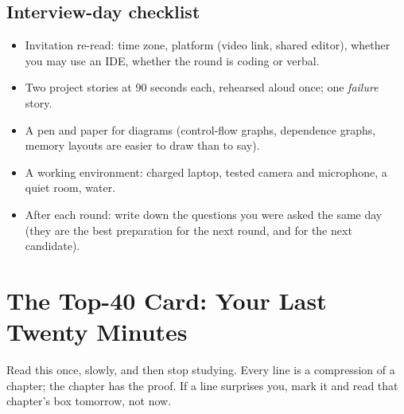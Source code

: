 \documentclass[10pt,a4paper,openany,oneside]{report}
\newcommand{\prio}[1]{\texorpdfstring{\ifcase#1\or{\color{gold}\ding{72}}\or{\color{gold}\ding{72}\ding{72}}\or{\color{gold}\ding{72}\ding{72}\ding{72}}\fi}{}}
\begin{document}
\section{Interview-day checklist \prio{2}}
\begin{itemize}[label=$\square$]
\item Invitation re-read: time zone, platform (video link, shared editor), whether you may use an IDE, whether the round is coding or verbal.
\item Two project stories at 90 seconds each, rehearsed aloud once; one \emph{failure} story.
\item A pen and paper for diagrams (control-flow graphs, dependence graphs, memory layouts are easier to draw than to say).
\item A working environment: charged laptop, tested camera and microphone, a quiet room, water.
\item After each round: write down the questions you were asked the same day (they are the best preparation for the next round, and for the next candidate).
\end{itemize}


\appendix
\chapter{The Top-40 Card: Your Last Twenty Minutes}
\label{app:top40}

\begin{chapbox}
Read this once, slowly, and then stop studying. Every line is a compression of a chapter; the chapter has the proof. If a line surprises you, mark it and read that chapter's box tomorrow, not now.
\end{chapbox}
\end{document}
